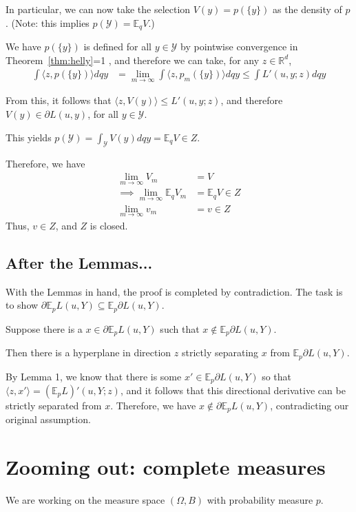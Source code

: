 \documentclass{article}
\newcommand{\Comments}{1}
\newcommand{\mytodo}[2]{\ifnum\Comments=1%
	\todo[linecolor=#1!80!black,backgroundcolor=#1,bordercolor=#1!80!black]{#2}\fi}
\newcommand{\jessiet}[1]{\mytodo{purple!20!white}{JF: #1}}
\newcommand{\reals}{\mathbb{R}}
\newcommand{\E}{\mathbb{E}}
\newcommand{\Y}{\mathcal{Y}}
\newcommand{\inprod}[2]{\langle #1, #2 \rangle}%
\begin{document}
In particular, we can now take the selection $V(y) = p(\{y\})$ as the density of $p$.
(Note: this implies $p(\Y) = \E_q V$.)

We have $p(\{y\})$ is defined for all $y \in \Y$ by pointwise convergence in Theorem~\ref{thm:helly}\jessiet{??}, and therefore we can take, for any $z \in \reals^d$, 
\begin{align*}
\int \inprod{z}{p(\{y\})} dqy &= \lim_{m \to \infty} \int \inprod{z}{p_m(\{y\})} dqy \leq \int L'(u,y;z) dqy
\end{align*}

From this, it follows that $\inprod{z}{V(y)} \leq L'(u,y;z)$, and therefore $V(y) \in \partial L(u,y)$, for all $y \in \Y$.

This yields $p(\Y) = \int_\Y V(y) dqy = \E_q V \in Z$.

Therefore, we have 
\begin{align*}
\lim_{m\to \infty} V_m &= V \\
\implies \lim_{m \to \infty} \E_q V_m &= \E_q V \in Z\\
\lim_{m \to \infty} v_m &= v \in Z
\end{align*}
Thus, $v \in Z$, and $Z$ is closed.

\subsection{After the Lemmas...}
With the Lemmas in hand, the proof is completed by contradiction.
The task is to show $\partial \E_p L(u,Y) \subseteq \E_p \partial L(u,Y)$.

Suppose there is a $x \in \partial \E_p L(u,Y)$ such that $x \not \in \E_p \partial L(u,Y)$.

Then there is a hyperplane in direction $z$ strictly separating $x$ from $\E_p \partial L(u,Y)$.

By Lemma 1, we know that there is some $x' \in \E_p \partial L(u,Y)$ so that $\inprod{z}{x'} = (\E_p L)'(u,Y;z)$, and it follows that this directional derivative can be strictly separated from $x$.
Therefore, we have $x \not \in \partial \E_p L(u,Y)$, contradicting our original assumption.


\section{Zooming out: complete measures}
We are working on the measure space $(\Omega, B)$ with probability measure $p$.
\end{document}
